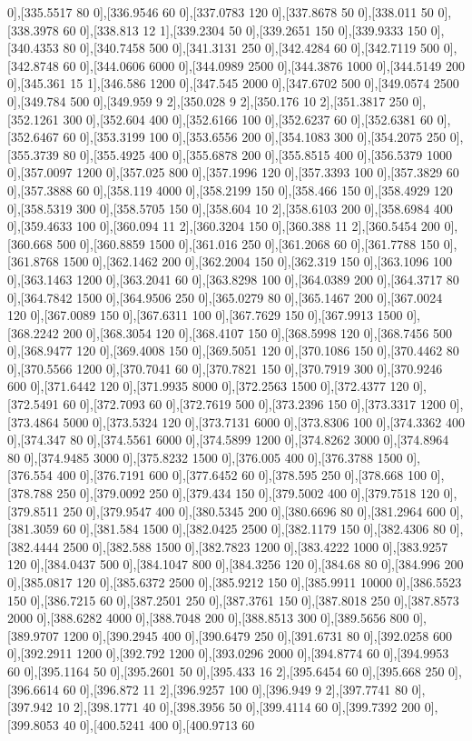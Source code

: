 {0],[335.5517 80 0],[336.9546 60 0],[337.0783 120 0],[337.8678 50 0],[338.011 50 0],[338.3978 60 0],[338.813 12 1],[339.2304 50 0],[339.2651 150 0],[339.9333 150 0],[340.4353 80 0],[340.7458 500 0],[341.3131 250 0],[342.4284 60 0],[342.7119 500 0],[342.8748 60 0],[344.0606 6000 0],[344.0989 2500 0],[344.3876 1000 0],[344.5149 200 0],[345.361 15 1],[346.586 1200 0],[347.545 2000 0],[347.6702 500 0],[349.0574 2500 0],[349.784 500 0],[349.959 9 2],[350.028 9 2],[350.176 10 2],[351.3817 250 0],[352.1261 300 0],[352.604 400 0],[352.6166 100 0],[352.6237 60 0],[352.6381 60 0],[352.6467 60 0],[353.3199 100 0],[353.6556 200 0],[354.1083 300 0],[354.2075 250 0],[355.3739 80 0],[355.4925 400 0],[355.6878 200 0],[355.8515 400 0],[356.5379 1000 0],[357.0097 1200 0],[357.025 800 0],[357.1996 120 0],[357.3393 100 0],[357.3829 60 0],[357.3888 60 0],[358.119 4000 0],[358.2199 150 0],[358.466 150 0],[358.4929 120 0],[358.5319 300 0],[358.5705 150 0],[358.604 10 2],[358.6103 200 0],[358.6984 400 0],[359.4633 100 0],[360.094 11 2],[360.3204 150 0],[360.388 11 2],[360.5454 200 0],[360.668 500 0],[360.8859 1500 0],[361.016 250 0],[361.2068 60 0],[361.7788 150 0],[361.8768 1500 0],[362.1462 200 0],[362.2004 150 0],[362.319 150 0],[363.1096 100 0],[363.1463 1200 0],[363.2041 60 0],[363.8298 100 0],[364.0389 200 0],[364.3717 80 0],[364.7842 1500 0],[364.9506 250 0],[365.0279 80 0],[365.1467 200 0],[367.0024 120 0],[367.0089 150 0],[367.6311 100 0],[367.7629 150 0],[367.9913 1500 0],[368.2242 200 0],[368.3054 120 0],[368.4107 150 0],[368.5998 120 0],[368.7456 500 0],[368.9477 120 0],[369.4008 150 0],[369.5051 120 0],[370.1086 150 0],[370.4462 80 0],[370.5566 1200 0],[370.7041 60 0],[370.7821 150 0],[370.7919 300 0],[370.9246 600 0],[371.6442 120 0],[371.9935 8000 0],[372.2563 1500 0],[372.4377 120 0],[372.5491 60 0],[372.7093 60 0],[372.7619 500 0],[373.2396 150 0],[373.3317 1200 0],[373.4864 5000 0],[373.5324 120 0],[373.7131 6000 0],[373.8306 100 0],[374.3362 400 0],[374.347 80 0],[374.5561 6000 0],[374.5899 1200 0],[374.8262 3000 0],[374.8964 80 0],[374.9485 3000 0],[375.8232 1500 0],[376.005 400 0],[376.3788 1500 0],[376.554 400 0],[376.7191 600 0],[377.6452 60 0],[378.595 250 0],[378.668 100 0],[378.788 250 0],[379.0092 250 0],[379.434 150 0],[379.5002 400 0],[379.7518 120 0],[379.8511 250 0],[379.9547 400 0],[380.5345 200 0],[380.6696 80 0],[381.2964 600 0],[381.3059 60 0],[381.584 1500 0],[382.0425 2500 0],[382.1179 150 0],[382.4306 80 0],[382.4444 2500 0],[382.588 1500 0],[382.7823 1200 0],[383.4222 1000 0],[383.9257 120 0],[384.0437 500 0],[384.1047 800 0],[384.3256 120 0],[384.68 80 0],[384.996 200 0],[385.0817 120 0],[385.6372 2500 0],[385.9212 150 0],[385.9911 10000 0],[386.5523 150 0],[386.7215 60 0],[387.2501 250 0],[387.3761 150 0],[387.8018 250 0],[387.8573 2000 0],[388.6282 4000 0],[388.7048 200 0],[388.8513 300 0],[389.5656 800 0],[389.9707 1200 0],[390.2945 400 0],[390.6479 250 0],[391.6731 80 0],[392.0258 600 0],[392.2911 1200 0],[392.792 1200 0],[393.0296 2000 0],[394.8774 60 0],[394.9953 60 0],[395.1164 50 0],[395.2601 50 0],[395.433 16 2],[395.6454 60 0],[395.668 250 0],[396.6614 60 0],[396.872 11 2],[396.9257 100 0],[396.949 9 2],[397.7741 80 0],[397.942 10 2],[398.1771 40 0],[398.3956 50 0],[399.4114 60 0],[399.7392 200 0],[399.8053 40 0],[400.5241 400 0],[400.9713 60 }
